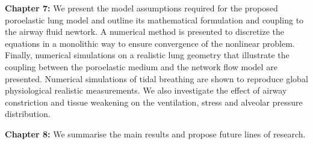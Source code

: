 \noindent \textbf{Chapter 7:} We present the model assumptions required for the proposed poroelastic lung model and outline its mathematical formulation and coupling to the airway fluid newtork. A numerical method is presented to discretize the equations in a monolithic way to ensure convergence of the nonlinear problem. Finally, numerical simulations on a realistic lung geometry that illustrate the coupling between the poroelastic medium and the network flow model are presented. Numerical simulations of tidal breathing are shown to reproduce global physiological realistic measurements. We also investigate the effect of airway constriction and tissue weakening on the ventilation, stress and alveolar pressure distribution.
\newline

\noindent \textbf{Chapter 8:} We summarise the main results and propose future lines of research.
\newline



 
 


